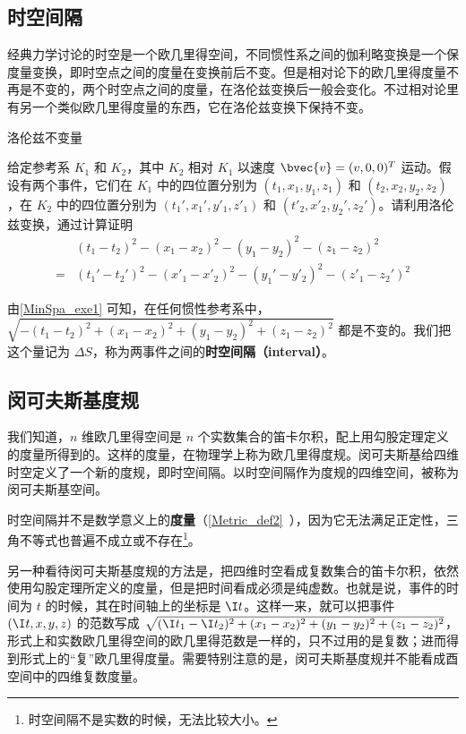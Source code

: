 

\subsection{时空间隔}
经典力学讨论的时空是一个欧几里得空间，不同惯性系之间的伽利略变换是一个保度量变换，即时空点之间的度量在变换前后不变。但是相对论下的欧几里得度量不再是不变的，两个时空点之间的度量，在洛伦兹变换后一般会变化。不过相对论里有另一个类似欧几里得度量的东西，它在洛伦兹变换下保持不变。

\begin{exercise}{洛伦兹不变量}\label{MinSpa_exe1}

给定参考系 $K_1$ 和 $K_2$，其中 $K_2$ 相对 $K_1$ 以速度 $\bvec{v}=(v,0,0)^T$ 运动。假设有两个事件，它们在 $K_1$ 中的四位置分别为 $(t_1, x_1, y_1, z_1)$ 和 $(t_2, x_2, y_2, z_2)$，在 $K_2$ 中的四位置分别为 $(t_1', x_1', y'_1, z'_1)$ 和 $(t'_2, x'_2, y_2', z_2')$。请利用洛伦兹变换，通过计算证明
\begin{equation}
\begin{aligned}
&(t_1-t_2)^2-(x_1-x_2)^2-(y_1-y_2)^2-(z_1-z_2)^2\\=&(t_1'-t_2')^2-(x'_1-x'_2)^2-(y_1'-y'_2)^2-(z'_1-z_2')^2
\end{aligned}
\end{equation}
\end{exercise}

由\autoref{MinSpa_exe1} 可知，在任何惯性参考系中，$\sqrt{-(t_1-t_2)^2+(x_1-x_2)^2+(y_1-y_2)^2+(z_1-z_2)^2}$ 都是不变的。我们把这个量记为 $\Delta S$，称为两事件之间的\textbf{时空间隔（interval）}。

\subsection{闵可夫斯基度规}

我们知道，$n$ 维欧几里得空间是 $n$ 个实数集合的笛卡尔积，配上用勾股定理定义的度量所得到的。这样的度量，在物理学上称为欧几里得度规。闵可夫斯基给四维时空定义了一个新的度规，即时空间隔。以时空间隔作为度规的四维空间，被称为闵可夫斯基空间。

时空间隔并不是数学意义上的\textbf{度量}（\autoref{Metric_def2}~），因为它无法满足正定性，三角不等式也普遍不成立或不存在\footnote{时空间隔不是实数的时候，无法比较大小。}。

另一种看待闵可夫斯基度规的方法是，把四维时空看成复数集合的笛卡尔积，依然使用勾股定理所定义的度量，但是把时间看成必须是纯虚数。也就是说，事件的时间为 $t$ 的时候，其在时间轴上的坐标是 $\I t$。这样一来，就可以把事件 $(\I t, x, y, z)$ 的范数写成 $\sqrt{(\I t_1-\I t_2)^2+(x_1-x_2)^2+(y_1-y_2)^2+(z_1-z_2)^2}$，形式上和实数欧几里得空间的欧几里得范数是一样的，只不过用的是复数；进而得到形式上的“复”欧几里得度量。需要特别注意的是，闵可夫斯基度规并不能看成酉空间中的四维复数度量。

